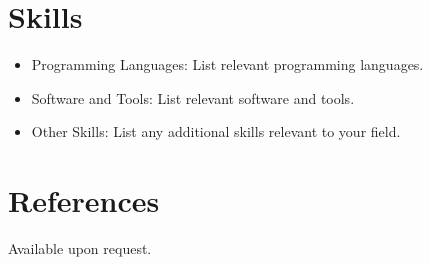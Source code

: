 \documentclass[a4paper,11pt]{article}
\begin{document}

\section*{Skills}

\begin{itemize}[leftmargin=*]
    \item Programming Languages: List relevant programming languages.
    
    \item Software and Tools: List relevant software and tools.
    
    \item Other Skills: List any additional skills relevant to your field.
\end{itemize}


\section*{References}

Available upon request.

\end{document}
